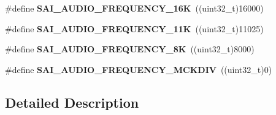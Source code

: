 \begin{DoxyCompactItemize}
\item 
\#define {\bfseries S\+A\+I\+\_\+\+A\+U\+D\+I\+O\+\_\+\+F\+R\+E\+Q\+U\+E\+N\+C\+Y\+\_\+16K}~((uint32\+\_\+t)16000)\hypertarget{group___s_a_i___audio___frequency_ga3eb424afd2cfadf7b954ffe86daca836}{}\label{group___s_a_i___audio___frequency_ga3eb424afd2cfadf7b954ffe86daca836}

\item 
\#define {\bfseries S\+A\+I\+\_\+\+A\+U\+D\+I\+O\+\_\+\+F\+R\+E\+Q\+U\+E\+N\+C\+Y\+\_\+11K}~((uint32\+\_\+t)11025)\hypertarget{group___s_a_i___audio___frequency_ga7794ab2711975ea3208885084651eda9}{}\label{group___s_a_i___audio___frequency_ga7794ab2711975ea3208885084651eda9}

\item 
\#define {\bfseries S\+A\+I\+\_\+\+A\+U\+D\+I\+O\+\_\+\+F\+R\+E\+Q\+U\+E\+N\+C\+Y\+\_\+8K}~((uint32\+\_\+t)8000)\hypertarget{group___s_a_i___audio___frequency_gaca8f23108867e3b46c8329b94d7cca76}{}\label{group___s_a_i___audio___frequency_gaca8f23108867e3b46c8329b94d7cca76}

\item 
\#define {\bfseries S\+A\+I\+\_\+\+A\+U\+D\+I\+O\+\_\+\+F\+R\+E\+Q\+U\+E\+N\+C\+Y\+\_\+\+M\+C\+K\+D\+IV}~((uint32\+\_\+t)0)\hypertarget{group___s_a_i___audio___frequency_gae0c30a794be4a87c49bc4a3cc31c4d88}{}\label{group___s_a_i___audio___frequency_gae0c30a794be4a87c49bc4a3cc31c4d88}

\end{DoxyCompactItemize}


\subsection{Detailed Description}
